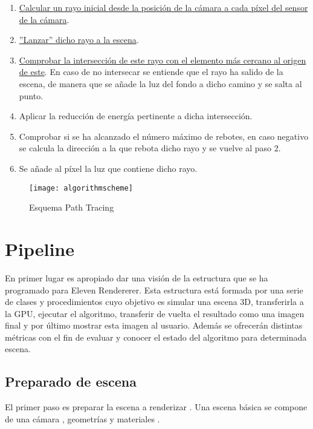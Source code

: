 \begin{enumerate}
	\item \hyperref[sec:calculatecameraray]{Calcular un rayo inicial desde la posición de la cámara a cada píxel del sensor de la cámara}.
	\item \hyperref[sec:throwray]{''Lanzar'' dicho rayo a la escena}.
	\item \hyperref[subsec:triintersection]{Comprobar la intersección de este rayo con el elemento más cercano al origen de este}. En caso de no intersecar se entiende que el rayo ha salido de la escena, de manera que se añade la luz del fondo a dicho camino y se salta al punto.
	\item Aplicar la reducción de energía pertinente a dicha intersección.
	\item Comprobar si se ha alcanzado el número máximo de rebotes, en caso negativo se calcula la dirección a la que rebota dicho rayo y se vuelve al paso 2.
	\item Se añade al píxel la luz que contiene dicho rayo.
\end{enumerate}

\begin{figure}[H]
    \centering
	\texttt{[image: algorithmscheme]}
	\caption{Esquema Path Tracing}
	\label{fig:algorithmscheme}
\end{figure}



	\section{Pipeline}
		
En primer lugar es apropiado dar una visión de la estructura que se ha programado para Eleven Rendererer. Esta estructura está formada por una serie de clases y procedimientos cuyo objetivo es simular una escena 3D, transferirla a la GPU, ejecutar el algoritmo, transferir de vuelta el resultado como una imagen final y por último mostrar esta imagen al usuario. Además se ofrecerán distintas métricas con el fin de evaluar y conocer el estado del algoritmo para determinada escena.

\subsection{Preparado de escena}

El primer paso es preparar la escena a renderizar . Una escena básica se compone de una cámara , geometrías  y materiales .

